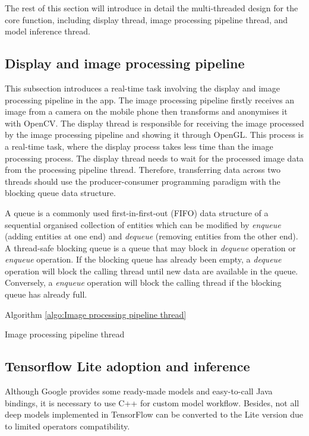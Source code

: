 The rest of this section will introduce in detail the multi-threaded design for the core function, including display thread, image processing pipeline thread, and model inference thread.

\subsection{Display and image processing pipeline}
This subsection introduces a real-time task involving the display and image processing pipeline in the app.
The image processing pipeline firstly receives an image from a camera on the mobile phone then transforms and anonymises it with OpenCV.
The display thread is responsible for receiving the image processed by the image processing pipeline and showing it through OpenGL.
This process is a real-time task, where the display process takes less time than the image processing process.
The display thread needs to wait for the processed image data from the processing pipeline thread.
Therefore, transferring data across two threads should use the producer-consumer programming paradigm with the blocking queue data structure.

A queue is a commonly used first-in-first-out (FIFO) data structure of a sequential organised collection of entities which can be modified by \textit{enqueue} (adding entities at one end) and \textit{dequeue} (removing entities from the other end).
A thread-safe blocking queue is a queue that may block in \textit{dequeue} operation or \textit{enqueue} operation.
If the blocking queue has already been empty, a \textit{dequeue} operation will block the calling thread until new data are available in the queue.
Conversely, a \textit{enqueue} operation will block the calling thread if the blocking queue has already full.

Algorithm \ref{algo:Image processing pipeline thread} 

\begin{algorithm}[!ht]
\caption{Image processing pipeline thread}
\label{algo:Image processing pipeline thread}

\end{algorithm}

\subsection{Tensorflow Lite adoption and inference}
Although Google provides some ready-made models and easy-to-call Java bindings, it is necessary to use C++ for custom model workflow.
Besides, not all deep models implemented in TensorFlow can be converted to the Lite version due to limited operators compatibility.


